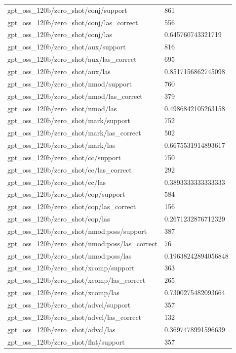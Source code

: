 \begin{tabular}{ll}
gpt\_oss\_120b/zero\_shot/conj/support & 861 \\
gpt\_oss\_120b/zero\_shot/conj/las\_correct & 556 \\
gpt\_oss\_120b/zero\_shot/conj/las & 0.645760743321719 \\
gpt\_oss\_120b/zero\_shot/aux/support & 816 \\
gpt\_oss\_120b/zero\_shot/aux/las\_correct & 695 \\
gpt\_oss\_120b/zero\_shot/aux/las & 0.8517156862745098 \\
gpt\_oss\_120b/zero\_shot/nmod/support & 760 \\
gpt\_oss\_120b/zero\_shot/nmod/las\_correct & 379 \\
gpt\_oss\_120b/zero\_shot/nmod/las & 0.4986842105263158 \\
gpt\_oss\_120b/zero\_shot/mark/support & 752 \\
gpt\_oss\_120b/zero\_shot/mark/las\_correct & 502 \\
gpt\_oss\_120b/zero\_shot/mark/las & 0.6675531914893617 \\
gpt\_oss\_120b/zero\_shot/cc/support & 750 \\
gpt\_oss\_120b/zero\_shot/cc/las\_correct & 292 \\
gpt\_oss\_120b/zero\_shot/cc/las & 0.3893333333333333 \\
gpt\_oss\_120b/zero\_shot/cop/support & 584 \\
gpt\_oss\_120b/zero\_shot/cop/las\_correct & 156 \\
gpt\_oss\_120b/zero\_shot/cop/las & 0.2671232876712329 \\
gpt\_oss\_120b/zero\_shot/nmod:poss/support & 387 \\
gpt\_oss\_120b/zero\_shot/nmod:poss/las\_correct & 76 \\
gpt\_oss\_120b/zero\_shot/nmod:poss/las & 0.19638242894056848 \\
gpt\_oss\_120b/zero\_shot/xcomp/support & 363 \\
gpt\_oss\_120b/zero\_shot/xcomp/las\_correct & 265 \\
gpt\_oss\_120b/zero\_shot/xcomp/las & 0.7300275482093664 \\
gpt\_oss\_120b/zero\_shot/advcl/support & 357 \\
gpt\_oss\_120b/zero\_shot/advcl/las\_correct & 132 \\
gpt\_oss\_120b/zero\_shot/advcl/las & 0.3697478991596639 \\
gpt\_oss\_120b/zero\_shot/flat/support & 357 \\

\end{tabular}
